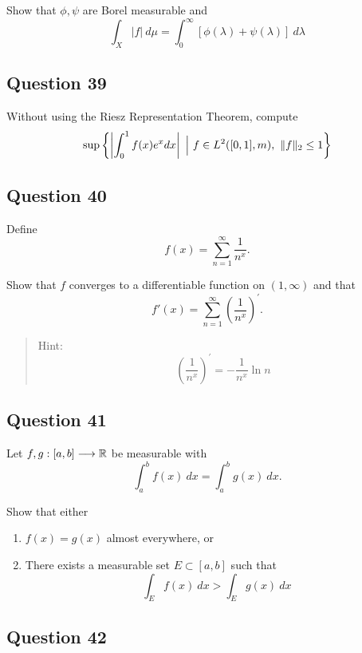 \documentclass[12pt]{article}
\providecommand{\tightlist}{%
  \setlength{\itemsep}{0pt}\setlength{\parskip}{0pt}}
\begin{document}
Show that \(\phi, \psi\) are Borel measurable and \[
\int_{X}|f| ~d \mu=\int_{0}^{\infty}[\phi(\lambda)+\psi(\lambda)] ~d \lambda
\]

\hypertarget{question-39-1}{%
\subsection{Question 39}\label{question-39-1}}

Without using the Riesz Representation Theorem, compute \[
\sup \left\{\left|\int_{0}^{1} f(x) e^{x} d x\right| {~\mathrel{\Big|}~} f \in L^{2}([0,1], m),~~ \|f\|_{2} \leq 1\right\}
\]

\hypertarget{question-40-1}{%
\subsection{Question 40}\label{question-40-1}}

Define \[
f(x) = \sum_{n=1}^{\infty} \frac{1}{n^{x}}.
\]

Show that \(f\) converges to a differentiable function on
\((1, \infty)\) and that \[
f'(x)  =\sum_{n=1}^{\infty}\left(\frac{1}{n^{x}}\right)^{\prime}.
\]

\begin{quote}
Hint: \[
\left(\frac{1}{n^{x}}\right)^{\prime}=-\frac{1}{n^{x}} \ln n
\]
\end{quote}

\hypertarget{question-41-1}{%
\subsection{Question 41}\label{question-41-1}}

Let \(f, g: [a, b] \longrightarrow {\mathbb{R}}\) be measurable with \[
\int_{a}^{b} f(x) ~d x=\int_{a}^{b} g(x) ~d x.
\]

Show that either

\begin{enumerate}
\def\labelenumi{\arabic{enumi}.}
\tightlist
\item
  \(f(x) = g(x)\) almost everywhere, or
\item
  There exists a measurable set \(E \subset [a, b]\) such that \[
  \int_{E} f(x) ~d x>\int_{E} g(x) ~d x
  \]
\end{enumerate}

\hypertarget{question-42-1}{%
\subsection{Question 42}\label{question-42-1}}
\end{document}
